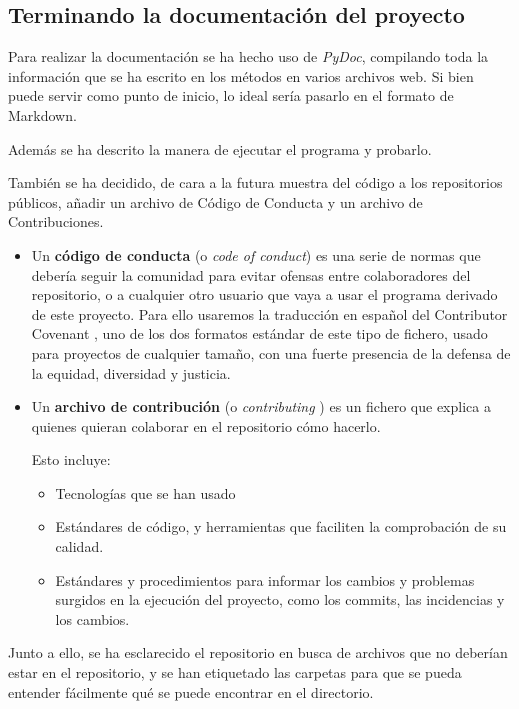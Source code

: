 \subsection{Terminando la documentación del proyecto}
Para realizar la documentación se ha hecho uso de \textit{PyDoc}, compilando toda la información que se ha escrito en los métodos en varios archivos web. Si bien puede servir como punto de inicio, lo ideal sería pasarlo en el formato de Markdown.

Además se ha descrito la manera de ejecutar el programa y probarlo.

También se ha decidido, de cara a la futura muestra del código a los repositorios públicos, añadir un archivo de Código de Conducta y un archivo de Contribuciones.

\begin{itemize}
	\item Un \textbf{código de conducta} (o \textit{code of conduct}) es una serie de normas que debería seguir la comunidad para evitar ofensas entre colaboradores del repositorio, o a cualquier otro usuario que vaya a usar el programa derivado de este proyecto.
	Para ello usaremos la traducción en español del Contributor Covenant \cite{contributor-covenant}, uno de los dos formatos estándar de este tipo de fichero, usado para proyectos de cualquier tamaño, con una fuerte presencia de la defensa de la equidad, diversidad y justicia.
	\item Un \textbf{archivo de contribución} (o \textit{contributing} \cite{contributing}) es un fichero que explica a quienes quieran colaborar en el repositorio cómo hacerlo.
	
	Esto incluye:
	\begin{itemize}
		\item Tecnologías que se han usado
		\item Estándares de código, y herramientas que faciliten la comprobación de su calidad.
		\item Estándares y procedimientos para informar los cambios y problemas surgidos en la ejecución del proyecto, como los commits, las incidencias y los cambios.
	\end{itemize}
\end{itemize}

Junto a ello, se ha esclarecido el repositorio en busca de archivos que no deberían estar en el repositorio, y se han etiquetado las carpetas para que se pueda entender fácilmente qué se puede encontrar en el directorio.

